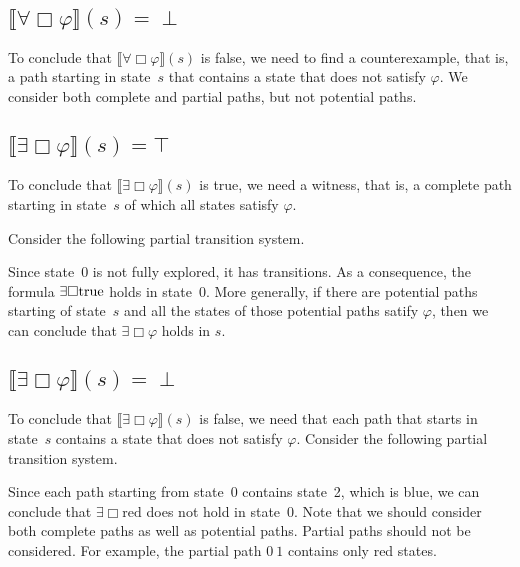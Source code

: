\documentclass[12pt]{article}
\newcommand{\always}{\Box}
\newcommand{\TRUE}{\mbox{\lstinline{true}}}
\theoremstyle{definition}
\newcommand{\satisfaction}[1]{\llbracket #1 \rrbracket}
\newenvironment{franck}{\color{red}}{\color{black}}
\begin{document}
\begin{franck}
\subsection*{$\satisfaction{\forall \always \varphi}(s) = \perp$}

To conclude that $\satisfaction{\forall \always \varphi}(s)$ is false, we need to find a counterexample, that is, a path starting in state~$s$ that contains a state that does not satisfy $\varphi$.  We consider both complete and partial paths, but not potential paths.

\subsection*{$\satisfaction{\exists \always \varphi}(s) = \top$}

To conclude that $\satisfaction{\exists \always \varphi}(s)$ is true, we need a witness, that is, a complete path starting in state~$s$ of which all states satisfy $\varphi$.  

Consider the following partial transition system.
\begin{center}
\end{center}
Since state~0 is not fully explored, it has transitions.  As a consequence, the formula $\exists \always \TRUE$ holds in state~0.  More generally, if there are potential paths starting of state~$s$ and all the states of those potential paths satify $\varphi$, then we can conclude that $\exists \always \varphi$ holds in $s$.

\subsection*{$\satisfaction{\exists \always \varphi}(s) = \perp$}

To conclude that $\satisfaction{\exists \always \varphi}(s)$ is false, we need that each path that starts in state~$s$ contains a state that does not satisfy $\varphi$.  Consider the following partial transition system.
\begin{center}
\end{center}
Since each path starting from state~0 contains state~2, which is blue, we can conclude that $\exists \always \mbox{red}$ does not hold in state~0.  Note that we should consider both complete paths as well as potential paths.  Partial paths should not be considered.  For example, the partial path $0\ 1$ contains only red states.


\end{franck}
\end{document}
